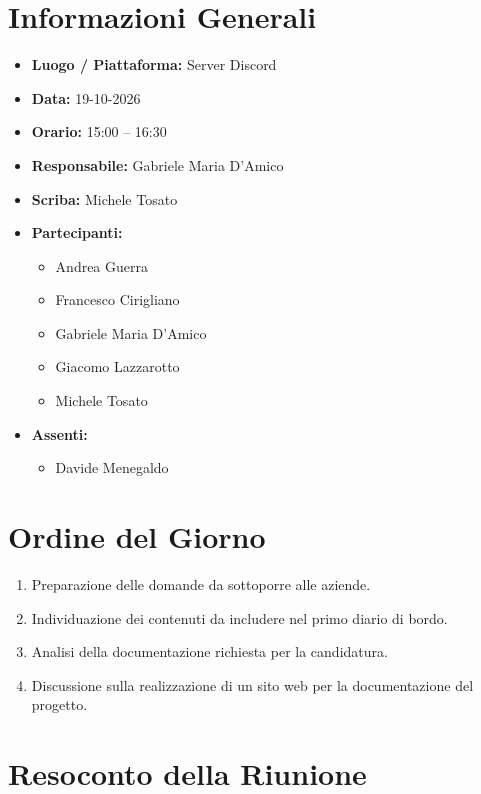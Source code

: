\documentclass[11pt, a4paper]{article}
\newcommand{\DocDate}{19-10-2026}
\begin{document}
\section{Informazioni Generali}
\begin{itemize}
    \item \textbf{Luogo / Piattaforma:} Server Discord
    \item \textbf{Data:} \DocDate
    \item \textbf{Orario:} 15:00 -- 16:30
    \item \textbf{Responsabile:} Gabriele Maria D'Amico
    \item \textbf{Scriba:} Michele Tosato
    \item \textbf{Partecipanti:}
        \begin{itemize}
            \item Andrea Guerra
            \item Francesco Cirigliano
            \item Gabriele Maria D'Amico
            \item Giacomo Lazzarotto
            \item Michele Tosato
        \end{itemize}
    \item \textbf{Assenti:}
        \begin{itemize}
            \item Davide Menegaldo
        \end{itemize}
\end{itemize}

\clearpage

\section{Ordine del Giorno}
\begin{enumerate}
    \item Preparazione delle domande da sottoporre alle aziende.
    \item Individuazione dei contenuti da includere nel primo diario di bordo.
    \item Analisi della documentazione richiesta per la candidatura.
    \item Discussione sulla realizzazione di un sito web per la documentazione del progetto.
\end{enumerate}

\clearpage

\section{Resoconto della Riunione}
\end{document}
